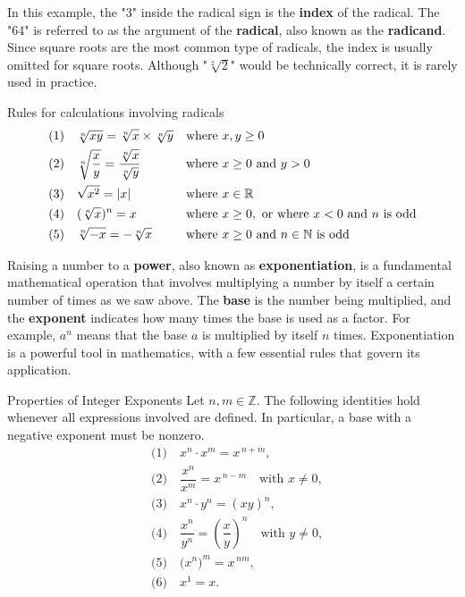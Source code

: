 In this example, the "3" inside the radical sign is the \textbf{index} of the radical. The "64" is referred to as the argument of the \textbf{radical}, also known as the \textbf{radicand}. Since square roots are the most common type of radicals, the index is usually omitted for square roots. Although "\(\sqrt[2]{2}\)" would be technically correct, it is rarely used in practice.
\begin{proposition}{Rules for calculations involving radicals}
    \begin{align*}
    &(1) \quad \sqrt[n]{x y}=\sqrt[n]{x} \times \sqrt[n]{y}   &   &\textnormal{where } x,y \geq 0\\
    &(2) \quad \sqrt[n]{\frac{x}{y}} = \frac{\sqrt[n]{x}}{\sqrt[n]{y}}    &   &\textnormal{where } x \geq 0 \textnormal{ and } y > 0 \\
    &(3) \quad \sqrt{x^2} = |x|   &   &\textnormal{where } x \in \mathbb{R} \\
    &(4) \quad (\sqrt[n]{x})^n = x    &   &\textnormal{where } x\geq 0, \textnormal{ or where } x<0 \textnormal{ and } n \textnormal{ is odd}\\
    &(5) \quad \sqrt[n]{-x}=-\sqrt[n]{x}  &   &\textnormal{where } x \geq 0 \textnormal{ and } n \in \mathbb{N} \textnormal{ is odd }
    \end{align*}
\end{proposition}

Raising a number to a \textbf{power}, also known as \textbf{exponentiation}, is a fundamental mathematical operation that involves multiplying a number by itself a certain number of times as we saw above. The \textbf{base} is the number being multiplied, and the \textbf{exponent} indicates how many times the base is used as a factor. For example, \(a^n\) means that the base \(a\) is multiplied by itself \(n\) times. Exponentiation is a powerful tool in mathematics, with a few essential rules that govern its application.

\begin{proposition}{Properties of Integer Exponents}
\label{prop:DefPow}
Let $n,m\in\mathbb{Z}$. The following identities hold whenever all expressions involved are defined. In particular, a base with a negative exponent must be nonzero.
\[
\begin{aligned}
&\text{(1)}\quad x^{n}\cdot x^{m}=x^{\,n+m},\\[2pt]
&\text{(2)}\quad \dfrac{x^{n}}{x^{m}}=x^{\,n-m}\quad \text{with } x\neq 0,\\[2pt]
&\text{(3)}\quad x^{n}\cdot y^{n}=(xy)^{n},\\[2pt]
&\text{(4)}\quad \dfrac{x^{n}}{y^{n}}=\left(\dfrac{x}{y}\right)^{n}\quad \text{with } y\neq 0,\\[2pt]
&\text{(5)}\quad \bigl(x^{n}\bigr)^{m}=x^{\,nm},\\[2pt]
&\text{(6)}\quad x^{1}=x.
\end{aligned}
\]
\end{proposition}


